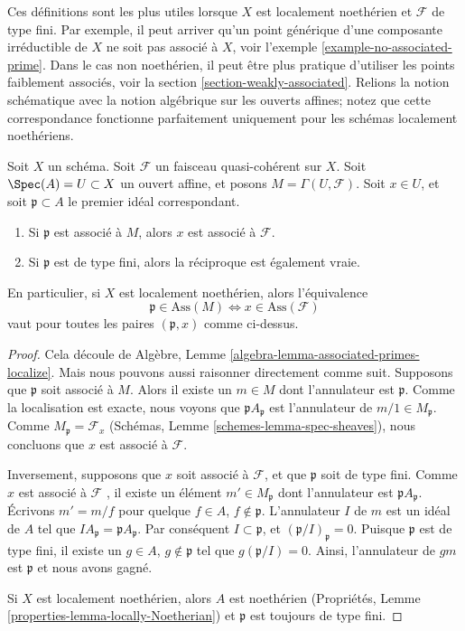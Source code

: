 \noindent
Ces définitions sont les plus utiles lorsque  $X$  est localement
noethérien et  $\mathcal{F}$  de type fini. Par exemple, il peut arriver qu'un point
générique d'une composante irréductible de  $X$  ne soit pas associé à
 $X$, voir l'exemple  \ref{example-no-associated-prime}. Dans le cas non noethérien, il peut
être plus pratique d'utiliser les points faiblement associés, voir la section
 \ref{section-weakly-associated}. Relions la notion schématique avec la notion algébrique sur les
ouverts affines; notez que cette correspondance fonctionne parfaitement uniquement
pour les schémas localement noethériens.

\begin{lemma}
\label{lemma-associated-affine-open}
Soit  $X$  un schéma. Soit  $\mathcal{F}$  un faisceau quasi-cohérent sur
 $X$. Soit  $\Spec(A) = U \subset X$  un ouvert affine, et posons  $M = \Gamma(U, \mathcal{F})$. Soit
 $x \in U$, et soit  $\mathfrak p \subset A$  le premier idéal correspondant.
\begin{enumerate}
\item Si  $\mathfrak p$  est associé à  $M$, alors  $x$  est associé à
 $\mathcal{F}$.
\item Si  $\mathfrak p$  est de type fini, alors la réciproque est également vraie.
\end{enumerate}
En particulier, si  $X$  est localement noethérien, alors l'équivalence
$$
\mathfrak p \in \text{Ass}(M) \Leftrightarrow x \in \text{Ass}(\mathcal{F})
$$
vaut pour toutes les paires  $(\mathfrak p, x)$  comme ci-dessus.
\end{lemma}

\begin{proof}
Cela découle de Algèbre, Lemme  \ref{algebra-lemma-associated-primes-localize}. Mais nous pouvons aussi raisonner
directement comme suit. Supposons que  $\mathfrak p$  soit associé à  $M$.
Alors il existe un  $m \in M$  dont l'annulateur est  $\mathfrak p$. Comme la
localisation est exacte, nous voyons que  $\mathfrak pA_{\mathfrak p}$  est l'annulateur de
 $m/1 \in M_{\mathfrak p}$. Comme  $M_{\mathfrak p} = \mathcal{F}_x$  (Schémas, Lemme  \ref{schemes-lemma-spec-sheaves}), nous concluons que
 $x$  est associé à  $\mathcal{F}$.

\medskip\noindent
Inversement, supposons que  $x$  soit associé à  $\mathcal{F}$, et que
 $\mathfrak p$  soit de type fini. Comme  $x$  est associé à  $\mathcal{F}$ , il
existe un élément  $m' \in M_{\mathfrak p}$  dont l'annulateur est  $\mathfrak pA_{\mathfrak p}$. Écrivons
 $m' = m/f$  pour quelque  $f \in A$,  $f \not \in \mathfrak p$. L'annulateur  $I$  de
 $m$  est un idéal de  $A$  tel que  $IA_{\mathfrak p} = \mathfrak pA_{\mathfrak p}$. Par conséquent
 $I \subset \mathfrak p$, et  $(\mathfrak p/I)_{\mathfrak p} = 0$. Puisque  $\mathfrak p$  est de type fini, il existe un
 $g \in A$,  $g \not \in \mathfrak p$  tel que  $g(\mathfrak p/I) = 0$. Ainsi, l'annulateur de
 $gm$  est  $\mathfrak p$  et nous avons gagné.

\medskip\noindent
Si  $X$  est localement noethérien, alors  $A$  est noethérien
(Propriétés, Lemme  \ref{properties-lemma-locally-Noetherian}) et  $\mathfrak p$  est toujours de type fini.
\end{proof}

